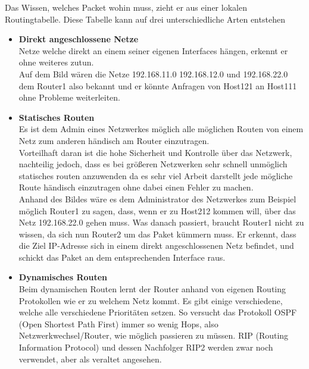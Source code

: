 \documentclass[11pt,a4paper]{report}
\begin{document}
Das Wissen, welches Packet wohin muss, zieht er aus einer lokalen Routingtabelle. Diese Tabelle kann auf drei unterschiedliche Arten entstehen\\
\begin{itemize}
\item \textbf{Direkt angeschlossene Netze}\\
Netze welche direkt an einem seiner eigenen Interfaces hängen, erkennt er ohne weiteres zutun.\\
Auf dem Bild wären die Netze 192.168.11.0 192.168.12.0 und 192.168.22.0 dem Router1 also bekannt und er könnte Anfragen von Host121 an Host111 ohne Probleme weiterleiten.
\item \textbf{Statisches Routen}\\
Es ist dem Admin eines Netzwerkes möglich alle möglichen Routen von einem Netz zum anderen händisch am Router einzutragen.\\
Vorteilhaft daran ist die hohe Sicherheit und Kontrolle über das Netzwerk, nachteilig jedoch, dass es bei größeren Netzwerken sehr schnell unmöglich statisches routen anzuwenden da es sehr viel Arbeit darstellt jede mögliche Route händisch einzutragen ohne dabei einen Fehler zu machen.\\
Anhand des Bildes wäre es dem Administrator des Netzwerkes zum Beispiel möglich Router1 zu sagen, dass, wenn er zu Host212 kommen will, über das Netz 192.168.22.0 gehen muss. Was danach passiert, braucht Router1 nicht zu wissen, da sich nun Router2 um das Paket kümmern muss. Er erkennt, dass die Ziel IP-Adresse sich in einem direkt angeschlossenen Netz befindet, und schickt das Paket an dem entsprechenden Interface raus.
\item \textbf{Dynamisches Routen}\\
Beim dynamischen Routen lernt der Router anhand von eigenen Routing Protokollen wie er zu welchem Netz kommt. Es gibt einige verschiedene, welche alle verschiedene Prioritäten setzen. So versucht das Protokoll OSPF (Open Shortest Path First) immer so wenig Hops, also Netzwerkwechsel/Router, wie möglich passieren zu müssen. RIP (Routing Information Protocol) und dessen Nachfolger RIP2 werden zwar noch verwendet, aber als veraltet angesehen.
\end{itemize}
\end{document}
